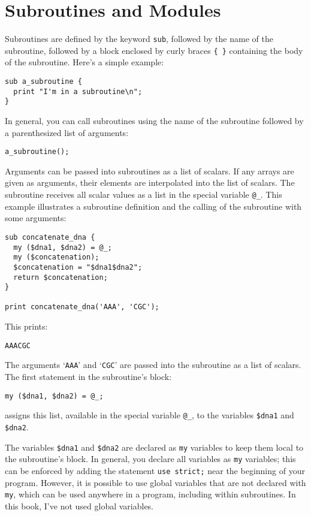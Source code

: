 \section{Subroutines and Modules}
Subroutines are defined by the keyword \verb|sub|, followed by the name of the subroutine, followed by a block enclosed by curly braces \verb|{ }| containing the body of the subroutine. Here's a simple example:

\begin{lstlisting}
sub a_subroutine {
  print "I'm in a subroutine\n";
}
\end{lstlisting}

In general, you can call subroutines using the name of the subroutine followed by a parenthesized list of arguments:

\begin{lstlisting}
a_subroutine();
\end{lstlisting}

Arguments can be passed into subroutines as a list of scalars. If any arrays are given as arguments, their elements are interpolated into the list of scalars. The subroutine receives all scalar values as a list in the special variable \verb|@_|. This example illustrates a subroutine definition and the calling of the subroutine with some arguments: 

\begin{lstlisting}
sub concatenate_dna {
  my ($dna1, $dna2) = @_;
  my ($concatenation);
  $concatenation = "$dna1$dna2";
  return $concatenation;
}

print concatenate_dna('AAA', 'CGC');
\end{lstlisting}

This prints:

\begin{lstlisting}
AAACGC
\end{lstlisting}

The arguments `\verb|AAA|' and `\verb|CGC|' are passed into the subroutine as a list of scalars. The first statement in the subroutine's block:

\begin{lstlisting}
my ($dna1, $dna2) = @_;
\end{lstlisting}

assigns this list, available in the special variable \verb|@_|, to the variables \verb|$dna1| and \verb|$dna2|.

The variables \verb|$dna1| and \verb|$dna2| are declared as \verb|my| variables to keep them local to the subroutine's block. In general, you declare all variables as \verb|my| variables; this can be enforced by adding the statement \verb|use strict;| near the beginning of your program. However, it is possible to use global variables that are not declared with \verb|my|, which can be used anywhere in a program, including within subroutines. In this book, I've not used global variables.

